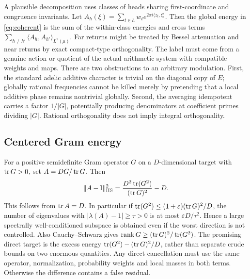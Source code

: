 \documentclass[11pt,a4paper]{article}
\begin{document}
A plausible decomposition uses classes of heads sharing first-coordinate and congruence invariants. Let $A_h(\xi)=\sum_{t\in h}w_t e^{2\pi i\langle z_t,\xi\rangle}$. Then the global energy in \eqref{eq:coherent} is the sum of the within-class energies and cross terms $\sum_{h\ne h'}\langle A_h,A_{h'}\rangle_{L^2(\mu)}$. Far returns might be treated by Bessel attenuation and near returns by exact compact-type orthogonality. The label must come from a genuine action or quotient of the actual arithmetic system with compatible weights and maps. There are two obstructions to an arbitrary modulation. First, the standard adelic additive character is trivial on the diagonal copy of $E$; globally rational frequencies cannot be killed merely by pretending that a local additive phase remains nontrivial globally. Second, the averaging idempotent carries a factor $1/|G|$, potentially producing denominators at coefficient primes dividing $|G|$. Rational orthogonality does not imply integral orthogonality.

\subsection{Centered Gram energy}
For a positive semidefinite Gram operator $G$ on a $D$-dimensional target with $\operatorname{tr} G>0$, set $A=D G/\operatorname{tr} G$. Then
\begin{equation}\label{eq:center}
\|A-\mathrm I\|_{\rm HS}^2=\frac{D^2\operatorname{tr}(G^2)}{(\operatorname{tr} G)^2}-D.
\end{equation}
This follows from $\operatorname{tr} A=D$. In particular if $\operatorname{tr}(G^2)\leq(1+\varepsilon)(\operatorname{tr} G)^2/D$, the number of eigenvalues with $|\lambda(A)-1|\geq\tau>0$ is at most $\varepsilon D/\tau^2$. Hence a large spectrally well-conditioned subspace is obtained even if the worst direction is not controlled. Also Cauchy--Schwarz gives $\operatorname{rank} G\geq(\operatorname{tr} G)^2/\operatorname{tr}(G^2)$. The promising direct target is the excess energy $\operatorname{tr}(G^2)-(\operatorname{tr} G)^2/D$, rather than separate crude bounds on two enormous quantities. Any direct cancellation must use the same operator, normalization, probability weights and local masses in both terms. Otherwise the difference contains a false residual.
\end{document}
